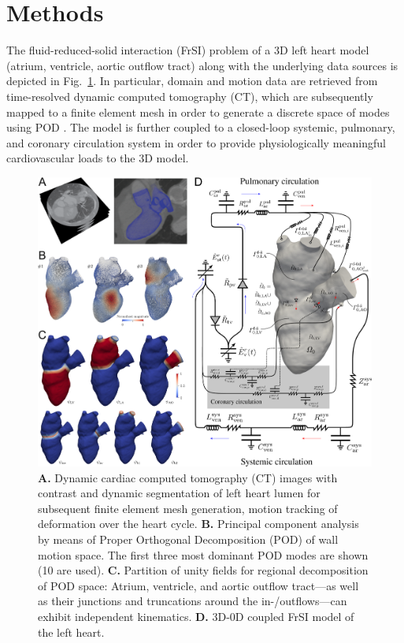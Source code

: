 \section*{Methods}
The fluid-reduced-solid interaction (FrSI) problem of a 3D left heart model (atrium, ventricle, aortic outflow tract) along with the underlying data sources is depicted in Fig.~\ref{fig:heart_problem}. 
In particular, domain and motion data are retrieved from time-resolved dynamic computed tomography (CT), which are subsequently mapped to a finite element mesh in order to generate a discrete space of modes using POD \cite{rathinam2003}. 
The model is further coupled to a closed-loop systemic, pulmonary, and coronary circulation system \cite{hirschvogel2017,arthurs2016} in order to provide physiologically meaningful cardiovascular loads to the 3D model.
\begin{figure}[!htp]
\centering
\includegraphics[width=1\textwidth]{heart_problem}
\caption{\textbf{A.} Dynamic cardiac computed tomography (CT) images with contrast and dynamic segmentation of left heart lumen for subsequent finite element mesh generation, motion tracking of deformation over the heart cycle. 
\textbf{B.} Principal component analysis by means of Proper Orthogonal Decomposition (POD) of wall motion space. The first three most dominant POD modes are shown (10 are used). 
\textbf{C.} Partition of unity fields for regional decomposition of POD space: Atrium, ventricle, and aortic outflow tract---as well as their junctions and truncations around the in-/outflows---can exhibit independent kinematics. 
\textbf{D.} 3D-0D coupled FrSI model of the left heart.}\label{fig:heart_problem}
\end{figure}

